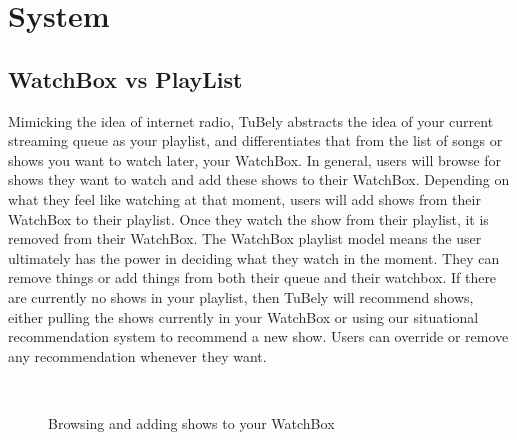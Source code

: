 \section{System}

\subsection{WatchBox vs PlayList}
Mimicking the idea of internet radio, TuBely abstracts the idea of
your current streaming queue as your playlist, and differentiates that
from the list of songs or shows you want to watch later, your
WatchBox.  In general, users will browse for shows they want to watch
and add these shows to their WatchBox.  Depending on what they feel
like watching at that moment, users will add shows from their WatchBox
to their playlist.  Once they watch the show from their playlist, it
is removed from their WatchBox.  The WatchBox playlist model means the
user ultimately has the power in deciding what they watch in the
moment.  They can remove things or add things from both their queue
and their watchbox.  If there are currently no shows in your playlist,
then TuBely will recommend shows, either pulling the shows currently
in your WatchBox or using our situational recommendation system to
recommend a new show.  Users can override or remove any recommendation
whenever they want.

\begin{figure}
\centering {}
           ~~
\caption{Browsing and adding shows to your WatchBox}
\label{fig:watchbox}
\end{figure}


